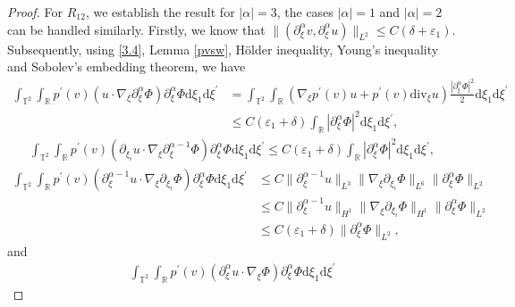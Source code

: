 \documentclass[10pt,reqno]{amsart}
\numberwithin{equation}{section}
\newcommand{\dif}{\mathrm{d}}
\newcommand{\ddiv}{\mathrm{div}}
\begin{document}
\begin{proof}
For $R_{12}$, we establish the result for $|\alpha|=3$, the cases $|\alpha|=1$ and $|\alpha|=2$ can be handled similarly. Firstly, we know that $\|(\partial^\alpha_\xi v, \partial^\alpha_\xi u)\|_{L^2}\le C(\delta+\varepsilon_1)$. Subsequently,
using \eqref{3.4}, Lemma \ref{pvsw}, H\"older inequality, Young's inequality and Sobolev's embedding theorem, we have
\begin{align*}
\int_{\mathbb{T}^2}\int_{\mathbb{R}}p^\prime(v)
\left( u\cdot\nabla_\xi\partial_{\xi}^\alpha\Phi\right)\partial_{\xi}^\alpha\Phi\dif \xi_1\dif \xi^{\prime}
&= \int_{\mathbb{T}^2}\int_{\mathbb{R}}
\left(\nabla_\xi p^\prime(v) u+p^\prime(v)\ddiv_\xi u\right)\frac{|\partial_{\xi}^\alpha\Phi|^2}{2}\dif \xi_1\dif \xi^{\prime}\\
&\le C(\varepsilon_1+\delta)\int_{\mathbb{R}}|\partial_\xi^\alpha\Phi|^2\dif \xi_1\dif \xi^{\prime},
\end{align*}
\begin{align*}
\int_{\mathbb{T}^2}\int_{\mathbb{R}}p^\prime(v)
\left(\partial_{\xi_i} u\cdot\nabla_\xi\partial_{\xi}^{\alpha-1}\Phi\right)\partial_{\xi}^\alpha\Phi\dif \xi_1\dif \xi^{\prime}
\le C(\varepsilon_1+\delta)\int_{\mathbb{R}}|\partial_\xi^\alpha\Phi|^2\dif \xi_1\dif \xi^{\prime},
\end{align*}
\begin{align*}
\int_{\mathbb{T}^2}\int_{\mathbb{R}}p^\prime(v)
\left(\partial_{\xi}^{\alpha-1} u\cdot\nabla_\xi\partial_{\xi_i} \Phi\right)\partial_{\xi}^\alpha\Phi\dif \xi_1\dif \xi^{\prime}
&\le C\|\partial_{\xi}^{\alpha-1} u\|_{L^3}\|\nabla_\xi\partial_{\xi_i} \Phi\|_{L^6}\|\partial_{\xi}^\alpha\Phi\|_{L^2}\\
&\le C\|\partial_{\xi}^{\alpha-1} u\|_{H^1}\|\nabla_\xi\partial_{\xi_i} \Phi\|_{H^1}\|\partial_{\xi}^\alpha\Phi\|_{L^2}\\
&\le C(\varepsilon_1+\delta)\|\partial_{\xi}^\alpha\Phi\|_{L^2},
\end{align*}
and
\begin{align*}
\int_{\mathbb{T}^2}\int_{\mathbb{R}}p^\prime(v)
\left(\partial_{\xi}^{\alpha} u\cdot\nabla_\xi \Phi\right)\partial_{\xi}^\alpha\Phi\dif \xi_1\dif \xi^{\prime}

\end{align*}
\end{proof}
\end{document}
